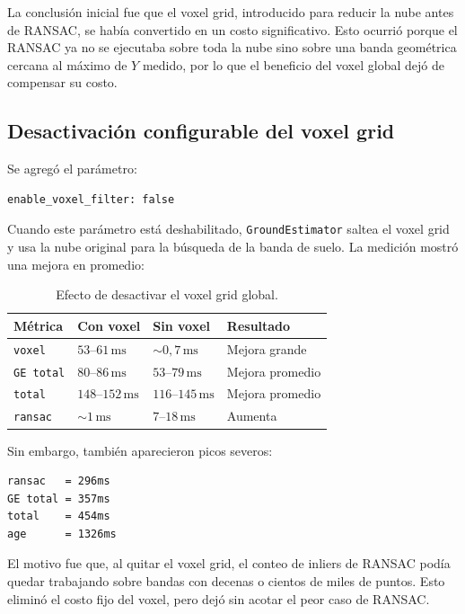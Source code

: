 La conclusión inicial fue que el voxel grid, introducido para reducir la nube
antes de RANSAC, se había convertido en un costo significativo. Esto ocurrió
porque el RANSAC ya no se ejecutaba sobre toda la nube sino sobre una banda
geométrica cercana al máximo de $Y$ medido, por lo que el beneficio del voxel
global dejó de compensar su costo.

\subsection{Desactivación configurable del voxel grid}
\label{subsec:perf-voxel-disable}

Se agregó el parámetro:

\begin{verbatim}
enable_voxel_filter: false
\end{verbatim}

Cuando este parámetro está deshabilitado, \texttt{GroundEstimator} saltea el
voxel grid y usa la nube original para la búsqueda de la banda de suelo. La
medición mostró una mejora en promedio:

\begin{table}[H]
\centering
\begin{tabular}{llll}
\toprule
\textbf{Métrica} & \textbf{Con voxel} & \textbf{Sin voxel} & \textbf{Resultado} \\
\midrule
\texttt{voxel} & $53$--$61\,\mathrm{ms}$ & $\sim 0{,}7\,\mathrm{ms}$ & Mejora grande \\
\texttt{GE total} & $80$--$86\,\mathrm{ms}$ & $53$--$79\,\mathrm{ms}$ & Mejora promedio \\
\texttt{total} & $148$--$152\,\mathrm{ms}$ & $116$--$145\,\mathrm{ms}$ & Mejora promedio \\
\texttt{ransac} & $\sim 1\,\mathrm{ms}$ & $7$--$18\,\mathrm{ms}$ & Aumenta \\
\bottomrule
\end{tabular}
\caption{Efecto de desactivar el voxel grid global.}
\label{tab:perf-voxel-disable}
\end{table}

Sin embargo, también aparecieron picos severos:

\begin{verbatim}
ransac   = 296ms
GE total = 357ms
total    = 454ms
age      = 1326ms
\end{verbatim}

El motivo fue que, al quitar el voxel grid, el conteo de inliers de RANSAC podía
quedar trabajando sobre bandas con decenas o cientos de miles de puntos. Esto
eliminó el costo fijo del voxel, pero dejó sin acotar el peor caso de RANSAC.


